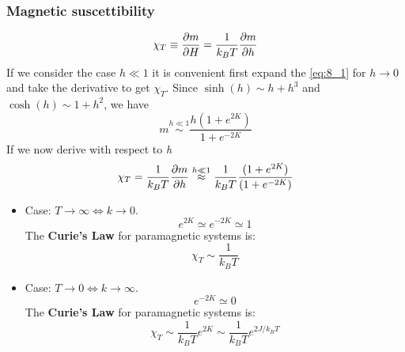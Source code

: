 \documentclass[../main/main.tex]{subfiles}
\begin{document}
\subsubsection{Magnetic suscettibility}
\begin{equation}
  \chi_T  \equiv  \pdv{m}{H} = \frac{1}{k_B T} \pdv{m}{h}
\end{equation}
If we consider the case \( h \ll 1 \) it is convenient first expand the  \eqref{eq:8_1} for \( h \rightarrow 0 \) and take the derivative to get \( \chi _T \). Since \( \sinh (h) \sim h+h^3 \) and \( \cosh (h) \sim 1 + h^2 \), we have
\begin{equation}
  m \overset{h \ll 1}{\sim } \frac{h (1+e^{2K} )}{1+e^{-2K} }
\end{equation}
If we now derive with respect to \emph{h}
\begin{equation}
  \chi _T = \frac{1}{k_B T} \pdv{m}{h} \overset{h \ll 1}{\approx } \frac{1}{k_B T} \frac{(1+e^{2K} )}{(1+e^{-2K} )}
\end{equation}
\begin{itemize}
\item Case: \( T \rightarrow \infty  \Leftrightarrow k \rightarrow 0\).
\begin{equation}
  e^{2K} \simeq e^{-2K} \simeq 1
\end{equation}
The \textbf{Curie's Law} for paramagnetic systems is:
\begin{equation}
  \chi _T \sim \frac{1}{k_B T}
\end{equation}
\item Case: \( T \rightarrow 0 \Leftrightarrow k \rightarrow \infty  \).
\begin{equation}
  e^{-2K} \simeq 0
\end{equation}
The \textbf{Curie's Law} for paramagnetic systems is:
\begin{equation}
  \chi _T \sim \frac{1}{k_B T} e^{2K} \sim  \frac{1}{k_B T} e^{2J/k_B T}
\end{equation}
\end{itemize}
\end{document}
